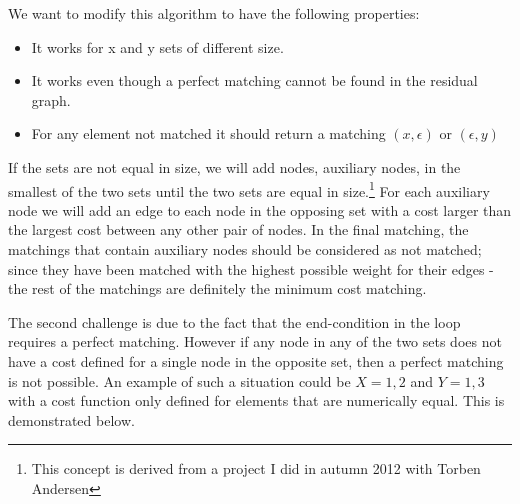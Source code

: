 \documentclass[11pt]{article}
\begin{document}
We want to modify this algorithm to have the following properties:

\begin{itemize}
\item It works for x and y sets of different size. 
\item It works even though a perfect matching cannot be found in the residual graph.
\item For any element not matched it should return a matching $(x, \epsilon)$ or $(\epsilon, y)$
\end{itemize}

If the sets are not equal in size, we will add nodes, auxiliary nodes, in the smallest of the two sets until the two sets are equal in size.\footnote{This concept is derived from a project I did in autumn 2012 with Torben Andersen} For each auxiliary node we will add an edge to each node in the opposing set with a cost larger than the largest cost between any other pair of nodes. In the final matching, the matchings that contain auxiliary nodes should be considered as not matched; since they have been matched with the highest possible weight for their edges - the rest of the matchings are definitely the minimum cost matching.

The second challenge is due to the fact that the end-condition in the loop requires a perfect matching. However if any node in any of the two sets does not have a cost defined for a single node in the opposite set, then a perfect matching is not possible. An example of such a situation could be $X={1, 2}$ and $Y={1, 3}$ with a cost function only defined for elements that are numerically equal. This is demonstrated below. \\
\end{document}
